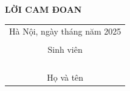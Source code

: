 \thispagestyle{empty}
\begin{center}
\fontsize{13pt}{1pt}\selectfont
    \textbf{LỜI CAM ĐOAN}
\end{center}

\fontsize{13pt}{1pt}\selectfont



\begin{table}[h!]
\raggedleft
  \begin{tabular}{c}
     \fontsize{13pt}{1pt}\selectfont
    Hà Nội, ngày  tháng  năm 2025    \\
    \\
     \fontsize{13pt}{1pt}\selectfont
    Sinh viên
    \\
    
    \\

    \\

    \\
    
    \\
    
     \fontsize{13pt}{1pt}\selectfont
    Họ và tên
    
  \end{tabular}
\end{table}